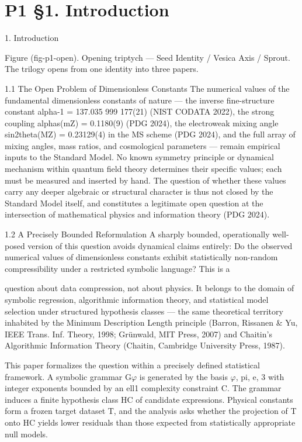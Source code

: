 
\section{P1 §1. Introduction}

1. Introduction

    Figure (fig-p1-open). Opening triptych --- Seed Identity / Vesica Axis / Sprout. The trilogy opens
                                 from one identity into three papers.

  1.1 The Open Problem of Dimensionless Constants
  The numerical values of the fundamental dimensionless constants of nature --- the
  inverse fine-structure constant alpha-1 = 137.035 999 177(21) (NIST CODATA 2022),
  the strong coupling alphas(mZ) = 0.1180(9) (PDG 2024), the electroweak mixing angle
  sin2theta(MZ) = 0.23129(4) in the MS scheme (PDG 2024), and the full array of mixing
  angles, mass ratios, and cosmological parameters --- remain empirical inputs to the
  Standard Model. No known symmetry principle or dynamical mechanism within
  quantum field theory determines their specific values; each must be measured and
  inserted by hand. The question of whether these values carry any deeper algebraic or
  structural character is thus not closed by the Standard Model itself, and constitutes a
  legitimate open question at the intersection of mathematical physics and information
  theory (PDG 2024).

  1.2 A Precisely Bounded Reformulation
  A sharply bounded, operationally well-posed version of this question avoids dynamical
  claims entirely: Do the observed numerical values of dimensionless constants exhibit
  statistically non-random compressibility under a restricted symbolic language? This is a

  question about data compression, not about physics. It belongs to the domain of
  symbolic regression, algorithmic information theory, and statistical model selection
  under structured hypothesis classes --- the same theoretical territory inhabited by the
  Minimum Description Length principle (Barron, Rissanen \& Yu, IEEE Trans. Inf.
  Theory, 1998; Grünwald, MIT Press, 2007) and Chaitin's Algorithmic Information
  Theory (Chaitin, Cambridge University Press, 1987).

  This paper formalizes the question within a precisely defined statistical framework. A
  symbolic grammar G$\varphi$ is generated by the basis {$\varphi$, pi, e, 3} with integer exponents
  bounded by an ell1 complexity constraint C. The grammar induces a finite hypothesis
  class HC of candidate expressions. Physical constants form a frozen target dataset T,
  and the analysis asks whether the projection of T onto HC yields lower residuals than
  those expected from statistically appropriate null models.

